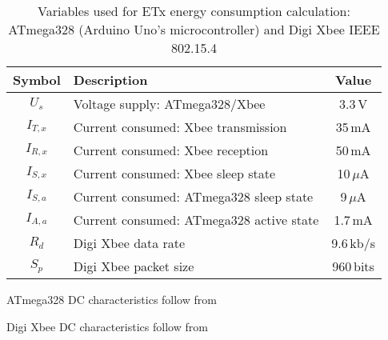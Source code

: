 \documentclass[11pt,draftclsnofoot,journal,onecolumn]{IEEEtran}
\begin{document}
\begin{table}
\centering
\begin{threeparttable}
\caption{Variables used for ETx energy consumption calculation: ATmega328 (Arduino Uno's microcontroller) and Digi Xbee IEEE 802.15.4}
\label{table:hardware_variable_table}
\scriptsize
\begin{tabular}{| c | l | c |}
\hline
Symbol & Description & Value \\
\hline\hline
$U_{s}$ & Voltage supply: ATmega328/Xbee & 3.3\,V \\
$I_{T,x}$ & Current consumed: Xbee transmission & 35\,mA \\
$I_{R,x}$ & Current consumed: Xbee reception & 50\,mA \\
$I_{S,x}$ & Current consumed: Xbee sleep state & 10\,$\mu$A \\
$I_{S,a}$ & Current consumed: ATmega328 sleep state & 9\,$\mu$A \\
$I_{A,a}$ & Current consumed: ATmega328 active state & 1.7\,mA \\
$R_{d}$ & Digi Xbee data rate & 9.6\,kb/s \\
$S_{p}$ & Digi Xbee packet size & 960\,bits \\
\hline
\end{tabular}
\begin{tablenotes}
\item ATmega328 DC characteristics follow from~\cite[Table 29-7]{avr_data_sheet}
\item Digi Xbee DC characteristics follow from~\cite{xbee_data_sheet}
\end{tablenotes}
\end{threeparttable}
\end{table}
\end{document}
